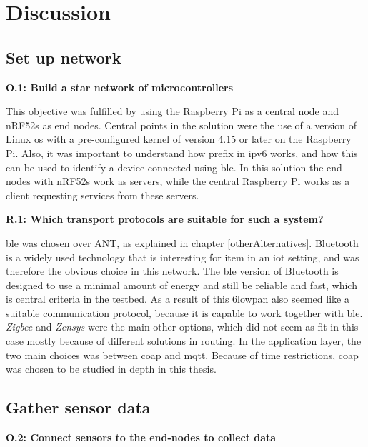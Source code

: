 \chapter{Discussion}
\label{chp:dataAnalysis}

\section{Set up network}

\noindent \textbf{O.1: Build a star network of microcontrollers}

\noindent  This objective was fulfilled by using the Raspberry Pi as a central node and nRF52s as end nodes. Central points in the solution were the use of a version of Linux \gls{os} with a pre-configured kernel of version 4.15 or later on the \gls{Raspberry Pi}. Also, it was important to understand how prefix in \gls{ipv6} works, and how this can be used to identify a device connected using \gls{ble}. In this solution the end nodes with \glspl{nRF52} work as servers, while the central Raspberry Pi works as a client requesting services from these servers. 


\noindent \textbf{R.1: Which transport protocols are suitable for such a system?}

\noindent \gls{ble} was chosen over ANT, as explained in chapter \ref{otherAlternatives}. Bluetooth is a widely used technology that is interesting for \gls{item} in an \gls{iot} setting, and was therefore the obvious choice in this network. The \gls{ble} version of Bluetooth is designed to use a minimal amount of energy and still be reliable and fast, which is central criteria in the testbed. As a result of this \gls{6lowpan} also seemed like a suitable communication protocol, because it is capable to work together with \gls{ble}. \textit{Zigbee} and \textit{Zensys} were the main other options, which did not seem as fit in this case mostly because of different solutions in routing. In the application layer, the two main choices was between \gls{coap} and \gls{mqtt}. Because of time restrictions, \gls{coap} was chosen to be studied in depth in this thesis. 

\newpage


\section{Gather sensor data}

\noindent\textbf{O.2: Connect sensors to the end-nodes to collect data}

